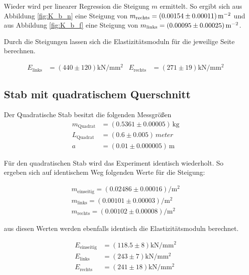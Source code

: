 \noindent Wieder wird per linearer Regression die Steigung $m$ ermittelt. So ergibt sich aus Abbildung \ref{fig:K_b_n} eine Steigung
von $m_\text{rechts}= \left( 0.00154 \pm 0.00011\right) \unit[per-mode=reciprocal]{\per \meter \squared} $ und aus Abbildung \ref{fig:K_b_f} eine Steigung von 
$m_\text{links}= \left( 0.00095\pm0.00025 \right) \unit[per-mode=reciprocal]{\per \meter \squared}$.

\noindent Durch die Steigungen lassen sich die Elastizitätsmoduln für die jeweilige Seite berechnen.

\begin{align}
    E_\text{links} & = \left( 440 \pm 120\right) \unit{\kilo \newton \per \milli \meter \squared} &
    E_\text{rechts} & = \left(271 \pm 19\right) \unit{\kilo \newton \per \milli \meter \squared}
\end{align}


\subsection{Stab mit quadratischem Querschnitt}
Der Quadratische Stab besitzt die folgenden Messgrößen
\begin{align*}
    m_\text{Quadrat} &= \left(0.5361 \pm 0.00005 \right)\,\unit{\kilo \gram} \\
    L_\text{Quadrat} &= \left(0.6 \pm 0.005 \right)\,\unit{meter}\\
    a &= \left(0.01 \pm 0.000005\right) \, \unit{\meter}
\end{align*}

Für den quadratischen Stab wird das Experiment identisch wiederholt. 
So ergeben sich auf identischem Weg folgenden Werte für die Steigung:

\begin{align}
    m_\text{einseitig} = \left(0.02486 \pm 0.00016\right)\unit{\per \meter \squared}  \\
    m_\text{links} = \left(0.00101\pm0.00003\right)\unit{\per \meter \squared}        \\
    m_\text{rechts} = \left(0.00102\pm0.00008\right)\unit{\per \meter \squared}
\end{align}

\noindent aus diesen Werten werden ebenfalls identisch die Elastizitätsmoduln berechnet.

\begin{align}
    E_\text{einseitig} &=\left(118.5   \pm 8\right)\unit{\kilo \newton \per \milli \meter \squared}    \\
    E_\text{links} &=    \left(243    \pm 7 \right)\unit{\kilo \newton \per \milli \meter \squared}     \\
    E_\text{rechts} &=   \left(241    \pm 18\right)\unit{\kilo \newton \per \milli \meter \squared}    
\end{align}

